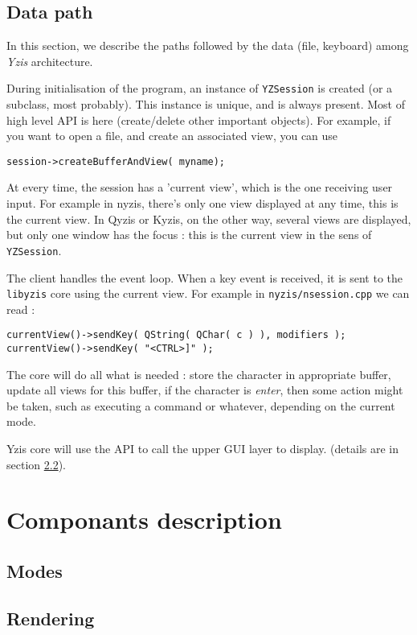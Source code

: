 \documentclass[a4paper,12pt]{report}
\begin{document}
\section{Data path}
In this section, we describe the paths followed by the data (file,
keyboard) among \emph{Yzis} architecture.

During initialisation of the program, an instance of \verb+YZSession+ is
created (or a subclass, most probably). This instance is unique, and is
always present. Most of high level API is here (create/delete other
important objects).
For example, if you want to open a file, and create an associated view, you
can use
\begin{verbatim}
session->createBufferAndView( myname);
\end{verbatim}

At every time, the session has a 'current view', which is the one receiving
user input. For example in nyzis, there's only one view displayed at any
time, this is the current view. In Qyzis or Kyzis, on the other way,
several views are displayed, but only one window has the focus : this is
the current view in the sens of \verb+YZSession+.

The client handles the event loop. When a key event is received, it is sent
to the \verb+libyzis+ core using the current view. For example in
\verb+nyzis/nsession.cpp+ we can read :
\begin{verbatim}
currentView()->sendKey( QString( QChar( c ) ), modifiers );
currentView()->sendKey( "<CTRL>]" );
\end{verbatim}

The core will do all what is needed : store the character in appropriate
buffer, update all views for this buffer, if the character is \emph{enter},
then some action might be taken, such as executing a command or whatever,
depending on the current mode.

Yzis core will use the API to call the upper GUI layer to display. (details
are in section \ref{rendering}).



\chapter{Componants description}

\section{Modes}


\section{Rendering}
\label{rendering}
\end{document}

